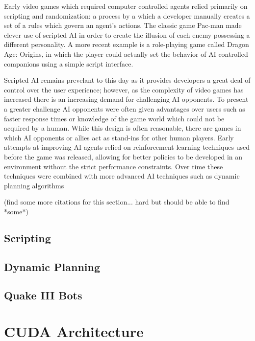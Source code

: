 Early video games which required computer controlled agents relied primarily on scripting and randomization: a process by a which a developer manually creates a set of a rules which govern an agent's actions. The classic game Pac-man made clever use of scripted AI in order to create the illusion of each enemy possessing a different personality. A more recent example is a role-playing game called Dragon Age: Origins, in which the player could actually set the behavior of AI controlled companions using a simple script interface.

Scripted AI remains prevelant to this day as it provides developers a great deal of control over the user experience; however, as the complexity of video games has increased there is an increasing demand for challenging AI opponents. To present a greater challenge AI opponents were often given advantages over users such as faster response times or knowledge of the game world which could not be acquired by a human. While this design is often reasonable, there are games in which AI opponents or allies act as stand-ins for other human players. Early attempts at improving AI agents relied on reinforcement learning techniques used before the game was released, allowing for better policies to be developed in an environment without the strict performance constraints. Over time these techniques were combined with more advanced AI techniques such as dynamic planning algorithms

(find some more citations for this section... hard but should be able to find *some*)

\subsection{Scripting}

\subsection{Dynamic Planning}

\subsection{Quake III Bots}

\section{CUDA Architecture}
